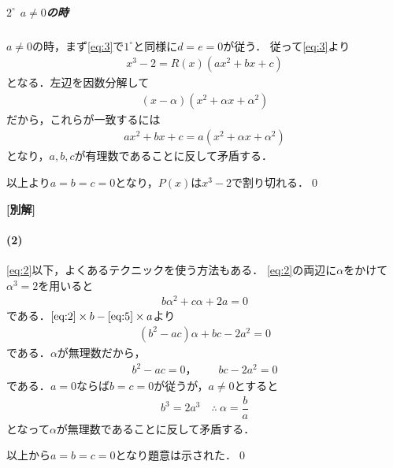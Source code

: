 \documentclass[../../main.tex]{subfiles}
\begin{document}
\subparagraph{$2^{\circ}$ $a\neq 0$の時}

$a\neq 0$の時，まず\cref{eq:3}で$1^{\circ}$と同様に$d=e=0$が従う．
従って\cref{eq:3}より
\begin{align}
  x^3-2 = R(x)(ax^2+bx+c)
\end{align}
となる．左辺を因数分解して
\begin{align}
  (x-\alpha)(x^2+\alpha x + \alpha^2)
\end{align}
だから，これらが一致するには
\begin{align}
  ax^2+bx+c = a(x^2+\alpha x + \alpha^2)
\end{align}
となり，$a,b,c$が有理数であることに反して矛盾する．
\casesend

以上より$a=b=c=0$となり，$P(x)$は$x^3-2$で割り切れる．\qed

{\bf [別解]}

\paragraph{(2)}

\cref{eq:2}以下，よくあるテクニックを使う方法もある．
\cref{eq:2}の両辺に$\alpha$をかけて$\alpha^3=2$を用いると
\begin{align}
  b\alpha^2+c\alpha+2a=0 \label{eq:5}
\end{align}
である．$\text{\cref{eq:2}}\times b - \text{\cref{eq:5}}\times a$より
\begin{align}
  (b^2-ac)\alpha+bc-2a^2=0
\end{align}
である．$\alpha$が無理数だから，
\begin{align}
  b^2-ac=0，\qquad bc-2a^2=0
\end{align}
である．$a=0$ならば$b=c=0$が従うが，$a\neq 0$とすると
\begin{align}
  b^3=2a^3 \quad\therefore\ \alpha=\dfrac{b}{a}
\end{align}
となって$\alpha$が無理数であることに反して矛盾する．

以上から$a=b=c=0$となり題意は示された．\qed

\newpage
\end{document}
